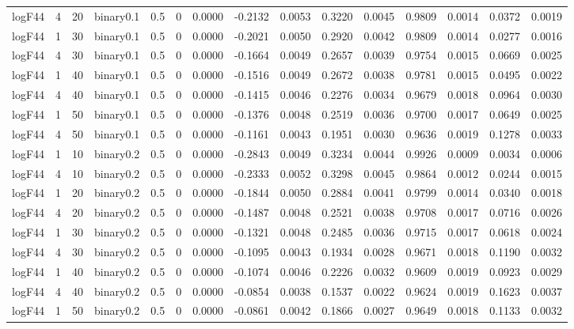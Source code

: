 \begin{longtable}{rrrrrrrrrrrrrrr}
  logF44 & 4 & 20 & binary0.1 & 0.5 & 0 & 0.0000 & -0.2132 & 0.0053 & 0.3220 & 0.0045 & 0.9809 & 0.0014 & 0.0372 & 0.0019 \\ 
  logF44 & 1 & 30 & binary0.1 & 0.5 & 0 & 0.0000 & -0.2021 & 0.0050 & 0.2920 & 0.0042 & 0.9809 & 0.0014 & 0.0277 & 0.0016 \\ 
  logF44 & 4 & 30 & binary0.1 & 0.5 & 0 & 0.0000 & -0.1664 & 0.0049 & 0.2657 & 0.0039 & 0.9754 & 0.0015 & 0.0669 & 0.0025 \\ 
  logF44 & 1 & 40 & binary0.1 & 0.5 & 0 & 0.0000 & -0.1516 & 0.0049 & 0.2672 & 0.0038 & 0.9781 & 0.0015 & 0.0495 & 0.0022 \\ 
  logF44 & 4 & 40 & binary0.1 & 0.5 & 0 & 0.0000 & -0.1415 & 0.0046 & 0.2276 & 0.0034 & 0.9679 & 0.0018 & 0.0964 & 0.0030 \\ 
  logF44 & 1 & 50 & binary0.1 & 0.5 & 0 & 0.0000 & -0.1376 & 0.0048 & 0.2519 & 0.0036 & 0.9700 & 0.0017 & 0.0649 & 0.0025 \\ 
  logF44 & 4 & 50 & binary0.1 & 0.5 & 0 & 0.0000 & -0.1161 & 0.0043 & 0.1951 & 0.0030 & 0.9636 & 0.0019 & 0.1278 & 0.0033 \\ 
  logF44 & 1 & 10 & binary0.2 & 0.5 & 0 & 0.0000 & -0.2843 & 0.0049 & 0.3234 & 0.0044 & 0.9926 & 0.0009 & 0.0034 & 0.0006 \\ 
  logF44 & 4 & 10 & binary0.2 & 0.5 & 0 & 0.0000 & -0.2333 & 0.0052 & 0.3298 & 0.0045 & 0.9864 & 0.0012 & 0.0244 & 0.0015 \\ 
  logF44 & 1 & 20 & binary0.2 & 0.5 & 0 & 0.0000 & -0.1844 & 0.0050 & 0.2884 & 0.0041 & 0.9799 & 0.0014 & 0.0340 & 0.0018 \\ 
  logF44 & 4 & 20 & binary0.2 & 0.5 & 0 & 0.0000 & -0.1487 & 0.0048 & 0.2521 & 0.0038 & 0.9708 & 0.0017 & 0.0716 & 0.0026 \\ 
  logF44 & 1 & 30 & binary0.2 & 0.5 & 0 & 0.0000 & -0.1321 & 0.0048 & 0.2485 & 0.0036 & 0.9715 & 0.0017 & 0.0618 & 0.0024 \\ 
  logF44 & 4 & 30 & binary0.2 & 0.5 & 0 & 0.0000 & -0.1095 & 0.0043 & 0.1934 & 0.0028 & 0.9671 & 0.0018 & 0.1190 & 0.0032 \\ 
  logF44 & 1 & 40 & binary0.2 & 0.5 & 0 & 0.0000 & -0.1074 & 0.0046 & 0.2226 & 0.0032 & 0.9609 & 0.0019 & 0.0923 & 0.0029 \\ 
  logF44 & 4 & 40 & binary0.2 & 0.5 & 0 & 0.0000 & -0.0854 & 0.0038 & 0.1537 & 0.0022 & 0.9624 & 0.0019 & 0.1623 & 0.0037 \\ 
  logF44 & 1 & 50 & binary0.2 & 0.5 & 0 & 0.0000 & -0.0861 & 0.0042 & 0.1866 & 0.0027 & 0.9649 & 0.0018 & 0.1133 & 0.0032 \\ 

\end{longtable}
